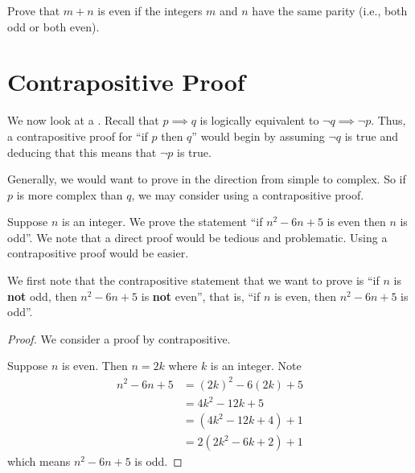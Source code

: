 \begin{exercise}
    Prove that $m + n$ is even if the integers $m$ and $n$ have the same parity (i.e., both odd or both even).
\end{exercise}

\section{Contrapositive Proof}
We now look at a . Recall that $p \implies q$ is logically equivalent to $\lnot q \implies \lnot p$. Thus, a contrapositive proof for ``if $p$ then $q$'' would begin by assuming $\lnot q$ is true and deducing that this means that $\lnot p$ is true.

Generally, we would want to prove in the direction from simple to complex. So if $p$ is more complex than $q$, we may consider using a contrapositive proof.

\begin{example}\label{example-if-(n-1)(n-5)-is-even-then-n-is-odd}
    Suppose $n$ is an integer. We prove the statement ``if $n^2 - 6n + 5$ is even then $n$ is odd''. We note that a direct proof would be tedious and problematic. Using a contrapositive proof would be easier.

    We first note that the contrapositive statement that we want to prove is ``if $n$ is \textbf{not} odd, then $n^2 - 6n + 5$ is \textbf{not} even'', that is, ``if $n$ is even, then $n^2 - 6n + 5$ is odd''.

    \begin{proof}
        We consider a proof by contrapositive.

        Suppose $n$ is even. Then $n = 2k$ where $k$ is an integer. Note
        \begin{align*}
            n^2 - 6n + 5 &= (2k)^2 - 6(2k) + 5\\
            &= 4k^2 - 12k + 5\\
            &= (4k^2 - 12k + 4) + 1\\
            &= 2(2k^2 - 6k + 2) + 1
        \end{align*}
        which means $n^2 - 6n + 5$ is odd.
    \end{proof}
\end{example}

